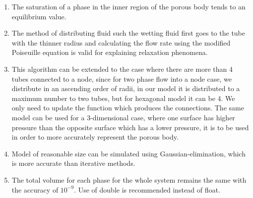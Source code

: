\begin{enumerate}

	\item The saturation of a phase in the inner region of the porous body tends to an equilibrium value.
	
	\item The method of distributing fluid such the wetting fluid first goes to the tube with the thinner radius and calculating the flow rate using the modified Poiseuille equation is valid for explaining relaxation phenomena.

	\item This algorithm can be extended to the case where there are more than 4 tubes connected to a node, since for two phase flow into a node case, we distribute in an ascending order of radii, in our model it is distributed to a maximum number to two tubes, but for hexagonal model it can be 4. We only need to update the function which produces the connections. The same model can be used for a 3-dimensional case, where one surface has higher pressure than the opposite surface which has a lower pressure, it is to be used in order to more accurately represent the porous body.
	
	\item Model of reasonable size can be simulated using Gaussian-elimination, which is more accurate than iterative methods.
	
	\item The total volume for each phase for the whole system remains the same with the accuracy of $10^{-9}$. Use of double is recommended instead of float.
	


\end{enumerate}



